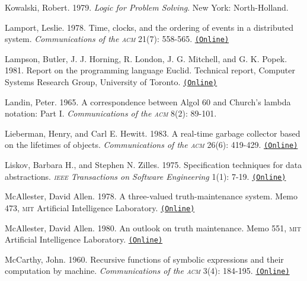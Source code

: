 \documentclass[oneside]{book}
\newcommand{\acronym}[1]{\textsc{\MakeLowercase{#1}}}
\newcommand{\code}[1]{\texttt{#1}}
\begin{document}
Kowalski, Robert.  1979.  \textit{Logic for Problem Solving}. New York:
North-Holland.

 \label{Lamport (1978)}
Lamport, Leslie. 1978.  Time, clocks, and the ordering of events in a
distributed system.  \textit{Communications of the \acronym{ACM}} 21(7): 558-565.
\href{http://www.stanford.edu/class/cs240/readings/lamport.pdf}{\code{(Online)}}

 \label{Lampson et al. 1981}
Lampson, Butler, J. J. Horning, R.  London, J. G. Mitchell, and G. K.  Popek.
1981.  Report on the programming language Euclid.  Technical report, Computer
Systems Research Group, University of Toronto.
\href{http://www.bitsavers.org/pdf/xerox/parc/techReports/CSL-81-12_Report_On_The_Programming_Language_Euclid.pdf}{\code{(Online)}}

 \label{Landin (1965)}
Landin, Peter.  1965.  A correspondence between Algol 60 and Church's lambda
notation: Part I.  \textit{Communications of the \acronym{ACM}} 8(2): 89-101.

 \label{Lieberman and Hewitt 1983}
Lieberman, Henry, and Carl E. Hewitt. 1983. A real-time garbage collector based
on the lifetimes of objects. \textit{Communications of the \acronym{ACM}}
26(6): 419-429.
\href{http://dspace.mit.edu/handle/1721.1/6335}{\code{(Online)}}

 \label{Liskov and Zilles (1975)}
Liskov, Barbara H., and Stephen N. Zilles.  1975.  Specification techniques for
data abstractions.  \textit{\acronym{IEEE} Transactions on Software Engineering}
1(1): 7-19.
\href{http://csg.csail.mit.edu/CSGArchives/memos/Memo-117.pdf}{\code{(Online)}}

 \label{McAllester (1978; 1980)}
McAllester, David Allen.  1978.  A three-valued truth-maintenance system.  Memo
473, \acronym{MIT} Artificial Intelligence Laboratory.
\href{http://dspace.mit.edu/handle/1721.1/6296}{\code{(Online)}}

McAllester, David Allen.  1980.  An outlook on truth maintenance.  Memo 551,
\acronym{MIT} Artificial Intelligence Laboratory.
\href{http://dspace.mit.edu/handle/1721.1/6327}{\code{(Online)}}

 \label{McCarthy 1960}
McCarthy, John.  1960.  Recursive functions of symbolic expressions and their
computation by machine.  \textit{Communications of the \acronym{ACM}}
3(4): 184-195.
\href{http://innovation.it.uts.edu.au/projectjmc/articles/recursive.html}{\code{(Online)}}
\end{document}
